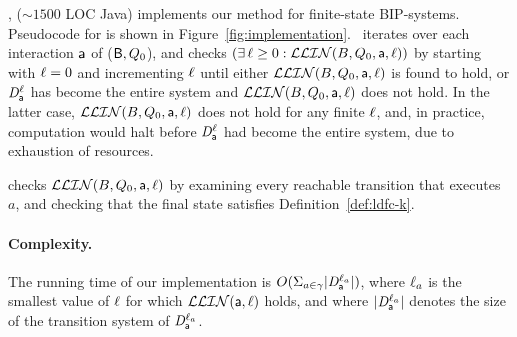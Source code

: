 
\ldfctool, ($\sim 1500$ LOC Java) implements our method for finite-state BIP-systems.
Pseudocode for \ldfctool is shown in Figure~\ref{fig:implementation}.
%
\ iterates over each interaction $\mathsf{a}$ of ($\mathsf{B}, Q_0$), and checks 
$(\exists\, \ell \ge 0: \mathcal{LLIN}(B, Q_0, \mathsf{a}, \ell))$ by starting with $\ell=0$ and incrementing $\ell$ until
either $\mathcal{LLIN}(B, Q_0, \mathsf{a}, \ell)$ is found to hold, or 
$\mathit{D}_{\mathsf{a}}^{\ell}$ has become the entire system and $\mathcal{LLIN}(B, Q_0, \mathsf{a}, \ell)$ does not hold. In the latter case, 
$\mathcal{LLIN}(B, Q_0, \mathsf{a}, \ell)$ does not hold for any finite $\ell$, and, in practice, 
computation would halt 
before $\mathit{D}_{\mathsf{a}}^{\ell}$ had become the entire system, due to exhaustion of resources.

 checks $\mathcal{LLIN}(B, Q_0, \mathsf{a}, \ell)$ by examining every reachable transition
that executes $a$, and checking that the final state satisfies
Definition~\ref{def:ldfc-k}. 

\paragraph{Complexity.} The running  time of our implementation is 
$O(\Sigma_{a \in \gamma} |\mathit{D}_{\mathsf{a}}^{\ell_a}|)$, where $\ell_a$ is the smallest value
of $\ell$ for which $\mathcal{LLIN}(\mathsf{a}, \ell)$ holds, and where
$|\mathit{D}_{\mathsf{a}}^{\ell_a}|$ denotes the size of the transition system of $\mathit{D}_{\mathsf{a}}^{\ell_a}$.





